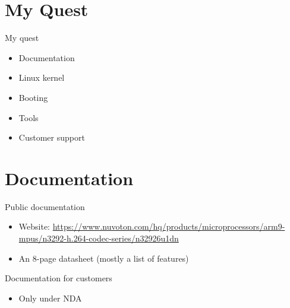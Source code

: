 \documentclass[xetex,table,aspectratio=169]{beamer}
\begin{document}
\section{My Quest}

\begin{frame}{My quest}
  \begin{itemize}
  \item Documentation
  \item Linux kernel
  \item Booting
  \item Tools
  \item Customer support
  \end{itemize}
\end{frame}

\section{Documentation}

\begin{frame}{Public documentation}
  \begin{itemize}
  \item Website:{\tiny
    \url{https://www.nuvoton.com/hq/products/microprocessors/arm9-mpus/n3292-h.264-codec-series/n32926u1dn}}
  \item An 8-page datasheet (mostly a list of features)
  \end{itemize}
\end{frame}

\begin{frame}{Documentation for customers}
  \begin{itemize}
  \item Only under NDA
  \end{itemize}
\end{frame}
\end{document}
